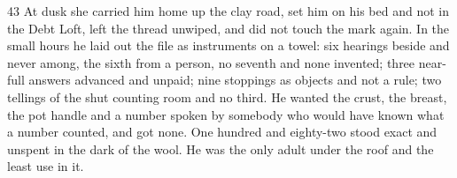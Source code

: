\begin{CRchronicle}{43}
At dusk she carried him home up the clay road, set him on his bed and not in the Debt Loft, left the thread unwiped, and did not touch the mark again. In the small hours he laid out the file as instruments on a towel: six hearings beside and never among, the sixth from a person, no seventh and none invented; three near-full answers advanced and unpaid; nine stoppings as objects and not a rule; two tellings of the shut counting room and no third. He wanted the crust, the breast, the pot handle and a number spoken by somebody who would have known what a number counted, and got none. One hundred and eighty-two stood exact and unspent in the dark of the wool. He was the only adult under the roof and the least use in it.
\end{CRchronicle}
